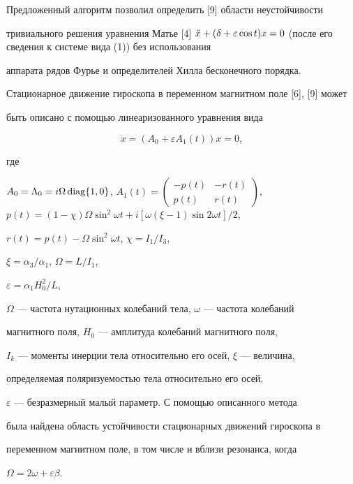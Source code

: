 \begin{note}


Предложенный алгоритм позволил определить [9] области неустойчивости 


тривиального решения уравнения Матье [4] $\Ddot{x}+(\delta+\varepsilon


\cos t)x=0$ (после его сведения к системе вида (1)) без использования 


аппарата рядов Фурье и определителей Хилла бесконечного порядка.


\end{note}





\begin{note}


Стационарное движение гироскопа в переменном магнитном поле [6], [9] может 


быть описано с помощью линеаризованного уравнения вида 


$$


\Dot{x}=(A_0+\varepsilon A_1(t))x=0,


$$


где


$A_0=\Lambda_0=i\Omega\diag \{1,0 \}$, $A_1(t)=\left(\begin{smallmatrix}


-p(t) & -r(t) \\ p(t) & r(t) 


\end{smallmatrix}\right)$, $p(t)=(1-\chi)\Omega \sin^2\omega t+i


[\omega(\xi-1)\sin 2\omega t ]/2$,


$r(t)=p(t)-\Omega \sin^2\omega t$, $\chi=I_1/I_3$,


$\xi=\alpha_3/\alpha_1$, $\Omega=L/I_1$,


$\varepsilon=\alpha_1H^2_0/L$,


$\Omega$ --- частота нутационных колебаний тела, $\omega$ --- частота колебаний 


магнитного поля, $H_0$ --- амплитуда колебаний магнитного поля,


$I_k$ --- моменты инерции тела относительно его осей, $\xi$ --- величина, 


определяемая поляризуемостью тела относительно его осей, 


$\varepsilon$ --- безразмерный малый параметр. С помощью описанного метода 


была найдена область устойчивости стационарных движений гироскопа в 


переменном магнитном поле, в том числе и вблизи резонанса, когда 


$\Omega=2\omega+\varepsilon \beta$.


\end{note}





